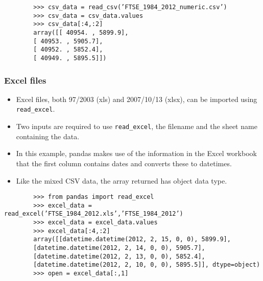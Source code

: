 \documentclass[KSmainSlides.tex]{subfiles}
\begin{document}
\begin{frame}[fragile]
	\begin{framed}
		\begin{verbatim}
		>>> csv_data = read_csv(’FTSE_1984_2012_numeric.csv’)
		>>> csv_data = csv_data.values
		>>> csv_data[:4,:2]
		array([[ 40954. , 5899.9],
		[ 40953. , 5905.7],
		[ 40952. , 5852.4],
		[ 40949. , 5895.5]])
		\end{verbatim}
	\end{framed}
\end{frame}
\begin{frame}[fragile]
	\frametitle{Excel files}
\begin{itemize}
\item Excel files, both 97/2003 (xls) and 2007/10/13 (xlsx), can be imported using \texttt{read\_excel}. 
\item Two inputs are
	required to use \texttt{read\_excel}, the filename and the sheet name containing the data. 
	\item In this example, pandas
	makes use of the information in the Excel workbook that the first column contains dates and converts
	these to datetimes. 
\item Like the mixed CSV data, the array returned has object data type.
\end{itemize}

\end{frame}
\begin{frame}[fragile]

	\begin{framed}
		\begin{verbatim}
		>>> from pandas import read_excel
		>>> excel_data = read_excel(’FTSE_1984_2012.xls’,’FTSE_1984_2012’)
		>>> excel_data = excel_data.values
		>>> excel_data[:4,:2]
		array([[datetime.datetime(2012, 2, 15, 0, 0), 5899.9],
		[datetime.datetime(2012, 2, 14, 0, 0), 5905.7],
		[datetime.datetime(2012, 2, 13, 0, 0), 5852.4],
		[datetime.datetime(2012, 2, 10, 0, 0), 5895.5]], dtype=object)
		>>> open = excel_data[:,1]
		\end{verbatim}
	\end{framed}
\end{frame}
\end{document}
